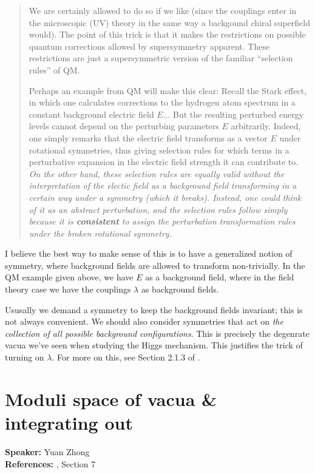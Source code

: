 \documentclass[a4paper
	,10pt
]{article}
\newcommand{\speaker}[1]{\noindent\textbf{Speaker:} #1}
\newcommand{\references}[1]{\noindent\textbf{References:} #1}
\begin{document}
	\begin{quote}\small
	We are certainly allowed to do so if we like (since the couplings enter in the microscopic (UV) theory in the same way a backgound chiral superfield would). The point of this trick is that it makes the restrictions on possible quantum corrections allowed by supersymmetry apparent. These restrictions are just a supersymmetric version of the familiar “selection rules” of QM.
		
	Perhaps an example from QM will make this clear: Recall the Stark effect, in which one calculates corrections to the hydrogen atom spectrum in a constant background electric field $E$... But the resulting perturbed energy levels cannot depend on the perturbing parameters $E$ arbitrarily. Indeed, one simply remarks that the electric field transforms as a vector $E$ under rotational symmetries, thus giving selection rules for which terms in a perturbative expansion in the electric field strength it can contribute to. \textit{On the other hand, these selection rules are equally valid without the interpretation of the electic field as a background field transforming in a certain way under a symmetry (which it breaks). Instead, one could think of it as an abstract perturbation, and the selection rules follow simply because it is \textbf{consistent} to assign the perturbation transformation rules under the broken rotational symmetry.}
	\end{quote}
	
	I believe the best way to make sense of this is to have a generalized notion of symmetry, where background fields are allowed to transform non-trivially. In the QM example given above, we have $E$ as a background field, where in the field theory case we have the couplings $\lambda$ as background fields. 
	
	Ususally we demand a symmetry to keep the background fields invariant; this is not always convenient. We should also consider symmetries that act on \textit{the collection of all possible background configurations}. This is precisely the degenrate vacua we've seen when studying the Higgs mechanism. This justifies the trick of turning on $\lambda$. For more on this, see Section 2.1.3 of \textcite{Banados:2016zim}%
	. 
	
\section{Moduli space of vacua \& integrating out}
	\speaker{Yuan Zhong}\\
	\references{%
	\textcite{Argyres:1996abc}, Section 7
	}\vspace{.5\baselineskip}
	
\vspace{1.2\baselineskip}
\pagebreak[4]
\raggedright
\printbibliography[%
	,heading = bibintoc
]
\end{document}
